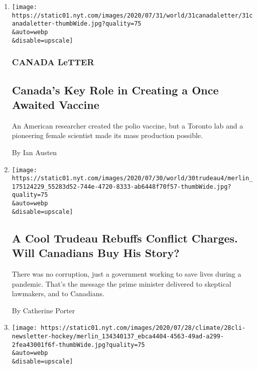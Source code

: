 \begin{enumerate}
\def\labelenumi{\arabic{enumi}.}
\item
  \href{/2020/07/31/world/canada/leone-farrell-chemist.html}{}

  \texttt{[image: https://static01.nyt.com/images/2020/07/31/world/31canadaletter/31canadaletter-thumbWide.jpg?quality=75\\\&auto=webp\\\&disable=upscale]}

  \hypertarget{canada-letter}{%
  \subsubsection{CANADA LeTTER}\label{canada-letter}}

  \hypertarget{canadas-key-role-in-creating-a-once-awaited-vaccine}{%
  \subsection{Canada's Key Role in Creating a Once Awaited
  Vaccine}\label{canadas-key-role-in-creating-a-once-awaited-vaccine}}

  An American researcher created the polio vaccine, but a Toronto lab
  and a pioneering female scientist made its mass production possible.

  By Ian Austen
\item
  \href{/2020/07/30/world/canada/justin-trudeau-we-charity.html}{}

  \texttt{[image: https://static01.nyt.com/images/2020/07/30/world/30trudeau4/merlin\_175124229\_55283d52-744e-4720-8333-ab6448f70f57-thumbWide.jpg?quality=75\\\&auto=webp\\\&disable=upscale]}

  \hypertarget{a-cool-trudeau-rebuffs-conflict-charges-will-canadians-buy-his-story}{%
  \subsection{A Cool Trudeau Rebuffs Conflict Charges. Will Canadians
  Buy His
  Story?}\label{a-cool-trudeau-rebuffs-conflict-charges-will-canadians-buy-his-story}}

  There was no corruption, just a government working to save lives
  during a pandemic. That's the message the prime minister delivered to
  skeptical lawmakers, and to Canadians.

  By Catherine Porter
\item
  \href{/2020/07/29/climate/skating-hockey-climate-change.html}{}

  \texttt{[image: https://static01.nyt.com/images/2020/07/28/climate/28cli-newsletter-hockey/merlin\_134340137\_ebca4404-4563-49ad-a299-2fea43001f6f-thumbWide.jpg?quality=75\\\&auto=webp\\\&disable=upscale]}


\end{enumerate}
